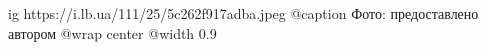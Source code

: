  
 
 
 
 

\ifcmt
  ig https://i.lb.ua/111/25/5c262f917adba.jpeg
	@caption Фото: предоставлено автором
  @wrap center
  @width 0.9
\fi
